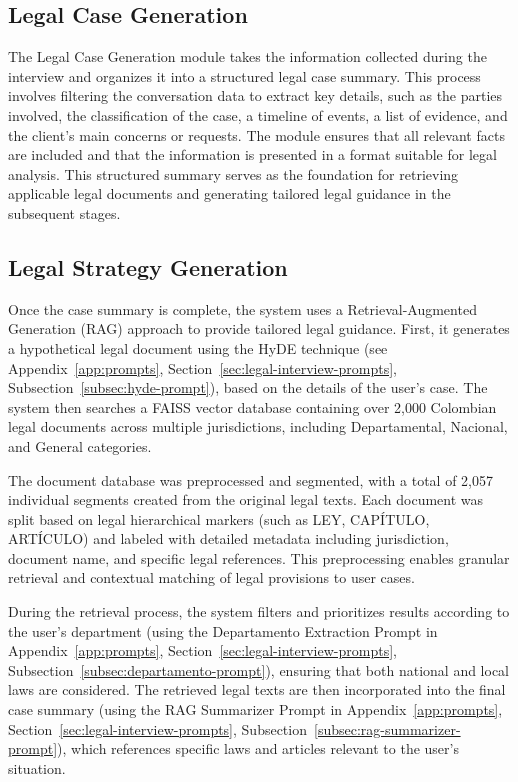 \subsection{Legal Case Generation}
The Legal Case Generation module takes the information collected during the interview and organizes it into a structured legal case summary. 
This process involves filtering the conversation data to extract key details, such as the parties involved, the classification of the case, 
a timeline of events, a list of evidence, and the client's main concerns or requests. The module ensures that all relevant facts are included 
and that the information is presented in a format suitable for legal analysis. This structured summary serves as the foundation for retrieving 
applicable legal documents and generating tailored legal guidance in the subsequent stages.

\subsection{Legal Strategy Generation}
Once the case summary is complete, the system uses a Retrieval-Augmented Generation (RAG) approach to provide tailored legal guidance. 
First, it generates a hypothetical legal document using the HyDE technique 
(see Appendix~\ref{app:prompts}, Section~\ref{sec:legal-interview-prompts}, Subsection~\ref{subsec:hyde-prompt}), 
based on the details of the user's case. The system then searches a 
FAISS vector database containing over 2,000 Colombian legal documents across multiple jurisdictions, including Departamental, Nacional, and 
General categories.

The document database was preprocessed and segmented, with a total of 2,057 individual segments created from the original legal texts. 
Each document was split based on legal hierarchical markers (such as LEY, CAPÍTULO, ARTÍCULO) and labeled with detailed metadata including 
jurisdiction, document name, and specific legal references. This preprocessing enables granular retrieval and contextual matching of legal 
provisions to user cases.

During the retrieval process, the system filters and prioritizes results according to the user's department 
(using the Departamento Extraction Prompt in Appendix~\ref{app:prompts}, Section~\ref{sec:legal-interview-prompts}, 
Subsection~\ref{subsec:departamento-prompt}), ensuring that both national and local laws are considered. 
The retrieved legal texts are then incorporated into the final case summary 
(using the RAG Summarizer Prompt in Appendix~\ref{app:prompts}, Section~\ref{sec:legal-interview-prompts}, 
Subsection~\ref{subsec:rag-summarizer-prompt}), which references specific laws and articles relevant to 
the user's situation.

